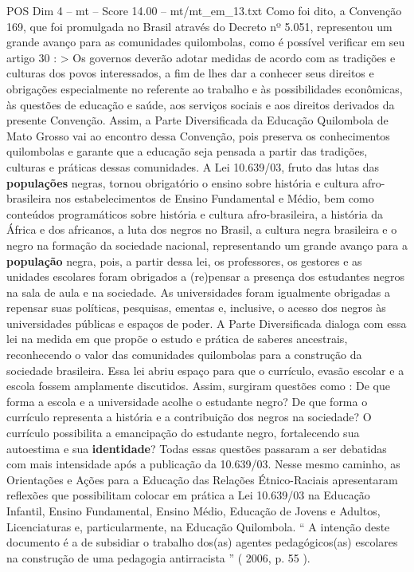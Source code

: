 \begin{textsample}{POS Dim 4 – mt – Score 14.00 – mt/mt\_em\_13.txt}
Como foi dito, a Convenção 169, que foi promulgada no Brasil através do Decreto nº 5.051, representou um grande avanço para as comunidades quilombolas, como é possível verificar em seu artigo 30 : > Os governos deverão adotar medidas de acordo com as tradições e culturas dos povos interessados, a fim de lhes dar a conhecer seus direitos e obrigações especialmente no referente ao trabalho e às possibilidades econômicas, às questões de educação e saúde, aos serviços sociais e aos direitos derivados da presente Convenção.
Assim, a Parte Diversificada da Educação Quilombola de Mato Grosso vai ao encontro dessa Convenção, pois preserva os conhecimentos quilombolas e garante que a educação seja pensada a partir das tradições, culturas e práticas dessas comunidades.
A Lei 10.639/03, fruto das lutas das \textbf{populações} negras, tornou obrigatório o ensino sobre história e cultura afro-brasileira nos estabelecimentos de Ensino Fundamental e Médio, bem como conteúdos programáticos sobre história e cultura afro-brasileira, a história da África e dos africanos, a luta dos negros no Brasil, a cultura negra brasileira e o negro na formação da sociedade nacional, representando um grande avanço para a \textbf{população} negra, pois, a partir dessa lei, os professores, os gestores e as unidades escolares foram obrigados a (re)pensar a presença dos estudantes negros na sala de aula e na sociedade.
As universidades foram igualmente obrigadas a repensar suas políticas, pesquisas, ementas e, inclusive, o acesso dos negros às universidades públicas e espaços de poder.
A Parte Diversificada dialoga com essa lei na medida em que propõe o estudo e prática de saberes ancestrais, reconhecendo o valor das comunidades quilombolas para a construção da sociedade brasileira.
Essa lei abriu espaço para que o currículo, evasão escolar e a escola fossem amplamente discutidos.
Assim, surgiram questões como : De que forma a escola e a universidade acolhe o estudante negro?
De que forma o currículo representa a história e a contribuição dos negros na sociedade?
O currículo possibilita a emancipação do estudante negro, fortalecendo sua autoestima e sua \textbf{identidade}?
Todas essas questões passaram a ser debatidas com mais intensidade após a publicação da 10.639/03.
Nesse mesmo caminho, as Orientações e Ações para a Educação das Relações Étnico-Raciais apresentaram reflexões que possibilitam colocar em prática a Lei 10.639/03 na Educação Infantil, Ensino Fundamental, Ensino Médio, Educação de Jovens e Adultos, Licenciaturas e, particularmente, na Educação Quilombola. “ A intenção deste documento é a de subsidiar o trabalho dos(as) agentes pedagógicos(as) escolares na construção de uma pedagogia antirracista ” ( 2006, p. 55 ).

\end{textsample}
